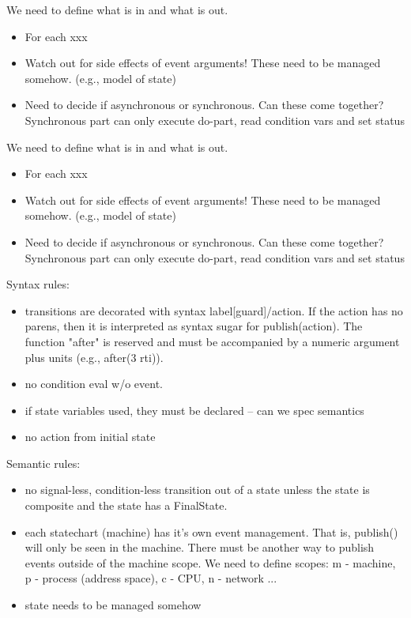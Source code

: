 \documentclass{article}
\begin{document}
We need to define what is in and what is out.

\begin{itemize}
\item
For each xxx
\item
Watch out for side effects of event arguments!  These need to 
be managed somehow.  (e.g., model of state)
\item
Need to decide if asynchronous or synchronous.  Can these come together?
Synchronous part can only execute do-part, read condition vars and
set status
\end{itemize}

We need to define what is in and what is out.


\begin{itemize}
\item
For each xxx
\item
Watch out for side effects of event arguments!  These need to 
be managed somehow.  (e.g., model of state)
\item
Need to decide if asynchronous or synchronous.  Can these come together?
Synchronous part can only execute do-part, read condition vars and
set status
\end{itemize}


Syntax rules:
\begin{itemize}
\item 
transitions are decorated with syntax label[guard]/action.
If the action has no parens, then it is interpreted as syntax
sugar for publish(action).  The function "after" is reserved
and must be accompanied by a numeric argument plus units
(e.g., after(3 rti)).
\item
no condition eval w/o event.
\item
if state variables used, they must be declared -- can we spec
semantics
\item
no action from initial state
\end{itemize}

Semantic rules:
\begin{itemize}
\item
no signal-less, condition-less transition out of a state unless the
state is composite and the state has a FinalState.
\item
each statechart (machine) has it's own event management.  That is,
publish() will only be seen in the machine.  There must be another
way to publish events outside of the machine scope.  We need to 
define scopes: m - machine, p - process (address space), c - CPU,
n - network ...
\item
state needs to be managed somehow
\end{itemize}
\end{document}
